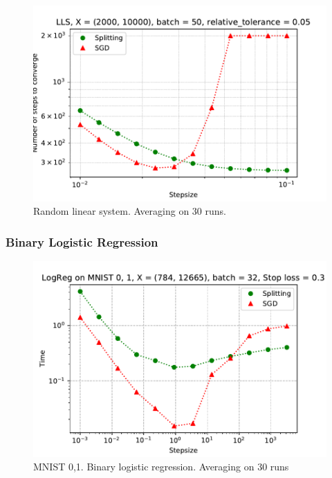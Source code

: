 \documentclass{article}
\begin{document}
\begin{figure}[ht]
\vskip 0.2in
\begin{center}
\centerline{\includegraphics[width=\columnwidth]{sgd_split_time_lls.pdf}}
\caption{Random linear system. Averaging on 30 runs.}
\label{strang:fig:lls_step_time}
\end{center}
\vskip -0.2in
\end{figure}

\subsubsection{Binary Logistic Regression}

\begin{figure}[ht]
\vskip 0.2in
\begin{center}
\centerline{\includegraphics[width=\columnwidth]{sgd_split_iterations_logreg.pdf}}
\caption{MNIST 0,1. Binary logistic regression. Averaging on 30 runs}
\label{strang:fig:logreg_step_iter}
\end{center}
\vskip -0.2in
\end{figure}
\end{document}
